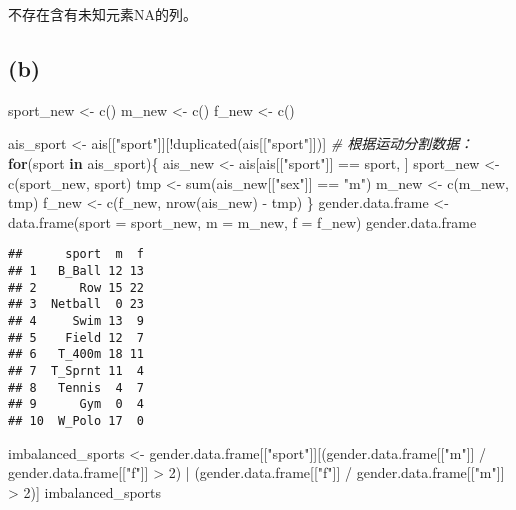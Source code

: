 \documentclass[
]{article}
\newenvironment{Shaded}{\begin{snugshade}}{\end{snugshade}}
\newcommand{\AttributeTok}[1]{\textcolor[rgb]{0.77,0.63,0.00}{#1}}
\newcommand{\CommentTok}[1]{\textcolor[rgb]{0.56,0.35,0.01}{\textit{#1}}}
\newcommand{\ControlFlowTok}[1]{\textcolor[rgb]{0.13,0.29,0.53}{\textbf{#1}}}
\newcommand{\DecValTok}[1]{\textcolor[rgb]{0.00,0.00,0.81}{#1}}
\newcommand{\FunctionTok}[1]{\textcolor[rgb]{0.00,0.00,0.00}{#1}}
\newcommand{\NormalTok}[1]{#1}
\newcommand{\OtherTok}[1]{\textcolor[rgb]{0.56,0.35,0.01}{#1}}
\newcommand{\SpecialCharTok}[1]{\textcolor[rgb]{0.00,0.00,0.00}{#1}}
\newcommand{\StringTok}[1]{\textcolor[rgb]{0.31,0.60,0.02}{#1}}
\begin{document}
不存在含有未知元素NA的列。

\hypertarget{b-3}{%
\subsection{(b)}\label{b-3}}

\begin{Shaded}
\begin{Highlighting}[]
\NormalTok{sport\_new }\OtherTok{\textless{}{-}} \FunctionTok{c}\NormalTok{()}
\NormalTok{m\_new }\OtherTok{\textless{}{-}} \FunctionTok{c}\NormalTok{()}
\NormalTok{f\_new }\OtherTok{\textless{}{-}} \FunctionTok{c}\NormalTok{()}

\NormalTok{ais\_sport }\OtherTok{\textless{}{-}}\NormalTok{ ais[[}\StringTok{"sport"}\NormalTok{]][}\SpecialCharTok{!}\FunctionTok{duplicated}\NormalTok{(ais[[}\StringTok{"sport"}\NormalTok{]])]}
\CommentTok{\# 根据运动分割数据：}
\ControlFlowTok{for}\NormalTok{(sport }\ControlFlowTok{in}\NormalTok{ ais\_sport)\{}
\NormalTok{  ais\_new }\OtherTok{\textless{}{-}}\NormalTok{ ais[ais[[}\StringTok{"sport"}\NormalTok{]] }\SpecialCharTok{==}\NormalTok{ sport, ]}
\NormalTok{  sport\_new }\OtherTok{\textless{}{-}} \FunctionTok{c}\NormalTok{(sport\_new, sport)}
\NormalTok{  tmp }\OtherTok{\textless{}{-}} \FunctionTok{sum}\NormalTok{(ais\_new[[}\StringTok{"sex"}\NormalTok{]] }\SpecialCharTok{==} \StringTok{"m"}\NormalTok{)}
\NormalTok{  m\_new }\OtherTok{\textless{}{-}} \FunctionTok{c}\NormalTok{(m\_new, tmp)}
\NormalTok{  f\_new }\OtherTok{\textless{}{-}} \FunctionTok{c}\NormalTok{(f\_new, }\FunctionTok{nrow}\NormalTok{(ais\_new) }\SpecialCharTok{{-}}\NormalTok{ tmp)}
\NormalTok{\}}
\NormalTok{gender.data.frame }\OtherTok{\textless{}{-}} \FunctionTok{data.frame}\NormalTok{(}\AttributeTok{sport =}\NormalTok{ sport\_new, }\AttributeTok{m =}\NormalTok{ m\_new, }\AttributeTok{f =}\NormalTok{ f\_new)}
\NormalTok{gender.data.frame}
\end{Highlighting}
\end{Shaded}

\begin{verbatim}
##      sport  m  f
## 1   B_Ball 12 13
## 2      Row 15 22
## 3  Netball  0 23
## 4     Swim 13  9
## 5    Field 12  7
## 6   T_400m 18 11
## 7  T_Sprnt 11  4
## 8   Tennis  4  7
## 9      Gym  0  4
## 10  W_Polo 17  0
\end{verbatim}

\begin{Shaded}
\begin{Highlighting}[]
\NormalTok{imbalanced\_sports }\OtherTok{\textless{}{-}}\NormalTok{ gender.data.frame[[}\StringTok{"sport"}\NormalTok{]][(gender.data.frame[[}\StringTok{"m"}\NormalTok{]] }\SpecialCharTok{/}\NormalTok{ gender.data.frame[[}\StringTok{"f"}\NormalTok{]] }\SpecialCharTok{\textgreater{}} \DecValTok{2}\NormalTok{) }\SpecialCharTok{|}\NormalTok{ (gender.data.frame[[}\StringTok{"f"}\NormalTok{]] }\SpecialCharTok{/}\NormalTok{ gender.data.frame[[}\StringTok{"m"}\NormalTok{]] }\SpecialCharTok{\textgreater{}} \DecValTok{2}\NormalTok{)]}
\NormalTok{imbalanced\_sports}
\end{Highlighting}
\end{Shaded}
\end{document}
